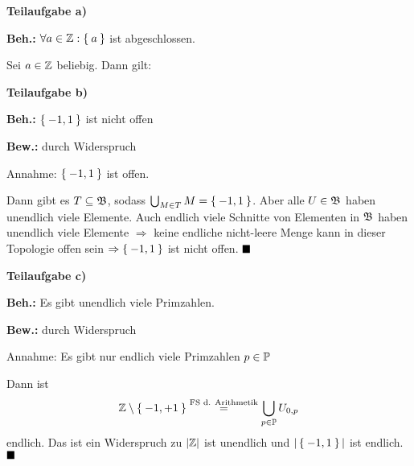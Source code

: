 \begin{solution}[\ref{ub1:aufg4}]
    \textbf{Teilaufgabe a)} 

    \textbf{Beh.:}  $\forall a \in \mathbb{Z}: \Set{a}$ ist abgeschlossen.

    Sei $a \in \mathbb{Z}$ beliebig. Dann gilt:

    \textbf{Teilaufgabe b)} 

    \textbf{Beh.:} $\Set{-1, 1}$ ist nicht offen

    \textbf{Bew.:} durch Widerspruch

    Annahme: $\Set{-1, 1}$ ist offen.

    Dann gibt es $T \subseteq \mathfrak{B}$, sodass $\bigcup_{M \in T} M = \Set{-1, 1}$.
    Aber alle $U \in \mathfrak{B}$ haben unendlich viele Elemente. Auch endlich
    viele Schnitte von Elementen in $\mathfrak{B}$ haben unendlich viele
    Elemente $\Rightarrow$ keine endliche nicht-leere Menge kann
    in dieser Topologie offen sein $\Rightarrow \Set{-1,1}$ ist
    nicht offen. $\qed$

    \textbf{Teilaufgabe c)} 

    \textbf{Beh.:} Es gibt unendlich viele Primzahlen.

    \textbf{Bew.:} durch Widerspruch

    Annahme:  Es gibt nur endlich viele Primzahlen $p \in \mathbb{P}$

    Dann ist 
    \[\mathbb{Z} \setminus \Set{-1, +1} \overset{\text{FS d. Arithmetik}}= \bigcup_{p \in \mathbb{P}} U_{0,p}\]
    endlich. Das ist ein Widerspruch zu $|\mathbb{Z}|$ ist unendlich und
    $|\Set{-1,1}|$ ist endlich. $\qed$
\end{solution}

